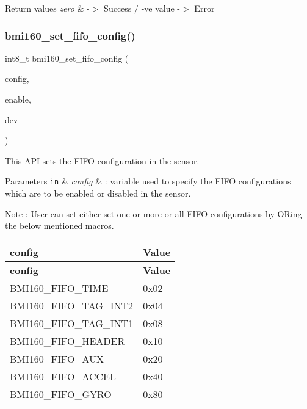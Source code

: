 \begin{DoxyRetVals}{Return values}
{\em zero} & -\/$>$ Success / -\/ve value -\/$>$ Error \\
\hline
\end{DoxyRetVals}
\mbox{\label{group__bmi160_gac5cead9788329ba97addba76997de01e}} 
\subsubsection{\texorpdfstring{bmi160\+\_\+set\+\_\+fifo\+\_\+config()}{bmi160\_set\_fifo\_config()}}
{\footnotesize\ttfamily int8\+\_\+t bmi160\+\_\+set\+\_\+fifo\+\_\+config (\begin{DoxyParamCaption}\item[{uint8\+\_\+t}]{config,  }\item[{uint8\+\_\+t}]{enable,  }\item[{struct \hyperlink{structbmi160__dev}{bmi160\+\_\+dev} const $\ast$}]{dev }\end{DoxyParamCaption})}



This A\+PI sets the F\+I\+FO configuration in the sensor. 


\begin{DoxyParams}[1]{Parameters}
\mbox{\tt in}  & {\em config} & \+: variable used to specify the F\+I\+FO configurations which are to be enabled or disabled in the sensor.\\
\hline
\end{DoxyParams}
\begin{DoxyNote}{Note}
\+: User can set either set one or more or all F\+I\+FO configurations by O\+Ring the below mentioned macros. \tabulinesep=1mm
\begin{longtabu} spread 0pt [c]{*{2}{|X[-1]}|}
\hline
\rowcolor{\tableheadbgcolor}\textbf{ config }&\textbf{ Value  }\\
\endfirsthead
\hline
\endfoot
\hline
\rowcolor{\tableheadbgcolor}\textbf{ config }&\textbf{ Value  }\\
\endhead
B\+M\+I160\+\_\+\+F\+I\+F\+O\+\_\+\+T\+I\+ME &0x02 \\
B\+M\+I160\+\_\+\+F\+I\+F\+O\+\_\+\+T\+A\+G\+\_\+\+I\+N\+T2 &0x04 \\
B\+M\+I160\+\_\+\+F\+I\+F\+O\+\_\+\+T\+A\+G\+\_\+\+I\+N\+T1 &0x08 \\
B\+M\+I160\+\_\+\+F\+I\+F\+O\+\_\+\+H\+E\+A\+D\+ER &0x10 \\
B\+M\+I160\+\_\+\+F\+I\+F\+O\+\_\+\+A\+UX &0x20 \\
B\+M\+I160\+\_\+\+F\+I\+F\+O\+\_\+\+A\+C\+C\+EL &0x40 \\
B\+M\+I160\+\_\+\+F\+I\+F\+O\+\_\+\+G\+Y\+RO &0x80 \\
\end{longtabu}

\end{DoxyNote}

